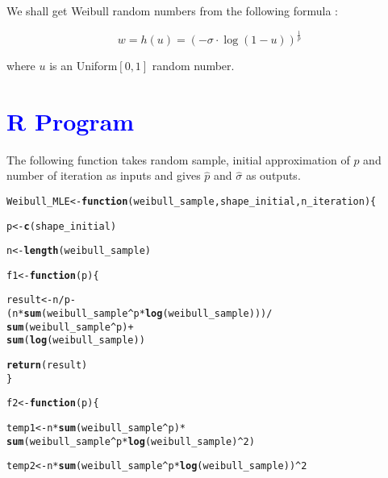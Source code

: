 \documentclass[11pt, a4paper]{article}\usepackage[]{graphicx}\usepackage[]{xcolor}
\makeatletter
\newcommand{\hlnum}[1]{\textcolor[rgb]{0.686,0.059,0.569}{#1}}%
\newcommand{\hlopt}[1]{\textcolor[rgb]{0,0,0}{#1}}%
\newcommand{\hldef}[1]{\textcolor[rgb]{0.345,0.345,0.345}{#1}}%
\newcommand{\hlkwa}[1]{\textcolor[rgb]{0.161,0.373,0.58}{\textbf{#1}}}%
\newcommand{\hlkwb}[1]{\textcolor[rgb]{0.69,0.353,0.396}{#1}}%
\newcommand{\hlkwc}[1]{\textcolor[rgb]{0.333,0.667,0.333}{#1}}%
\newcommand{\hlkwd}[1]{\textcolor[rgb]{0.737,0.353,0.396}{\textbf{#1}}}%
\newenvironment{kframe}{%
 \def\at@end@of@kframe{}%
 \ifinner\ifhmode%
  \def\at@end@of@kframe{\end{minipage}}%
  \begin{minipage}{\columnwidth}%
 \fi\fi%
 \def\FrameCommand##1{\hskip\@totalleftmargin \hskip-\fboxsep
 \colorbox{shadecolor}{##1}\hskip-\fboxsep
     \hskip-\linewidth \hskip-\@totalleftmargin \hskip\columnwidth}%
 \MakeFramed {\advance\hsize-\width
   \@totalleftmargin\z@ \linewidth\hsize
   \@setminipage}}%
 {\par\unskip\endMakeFramed%
 \at@end@of@kframe}
\newenvironment{knitrout}{}{} %
\makeatother
\begin{document}
We shall get Weibull random numbers from the following formula :

$$w = h(u) = (-\sigma \cdot \log (1 - u))^\frac{1}{p}$$

where $u$ is an Uniform$[0, 1]$ random number.


\section*{\faArrowAltCircleRight[regular] \textcolor{blue}{R Program}}

The following function takes random sample, initial approximation of $p$ and number of iteration as inputs and gives $\hat{p}$ and $\hat{\sigma}$ as outputs.

\begin{knitrout}
\color{fgcolor}\begin{kframe}
\begin{alltt}
\hldef{Weibull_MLE} \hlkwb{<-} \hlkwa{function}\hldef{(}\hlkwc{weibull_sample}\hldef{,} \hlkwc{shape_initial}\hldef{,} \hlkwc{n_iteration}\hldef{)\{}

  \hldef{p} \hlkwb{<-} \hlkwd{c}\hldef{(shape_initial)}

  \hldef{n} \hlkwb{<-} \hlkwd{length}\hldef{(weibull_sample)}

  \hldef{f1} \hlkwb{<-} \hlkwa{function}\hldef{(}\hlkwc{p}\hldef{)\{}

    \hldef{result} \hlkwb{<-} \hldef{n} \hlopt{/} \hldef{p} \hlopt{-}
              \hldef{( n} \hlopt{*} \hlkwd{sum}\hldef{(weibull_sample}\hlopt{^}\hldef{p} \hlopt{*} \hlkwd{log}\hldef{(weibull_sample)) )} \hlopt{/}
                        \hlkwd{sum}\hldef{(weibull_sample}\hlopt{^}\hldef{p)} \hlopt{+}
              \hlkwd{sum}\hldef{(}\hlkwd{log}\hldef{(weibull_sample))}

    \hlkwd{return}\hldef{(result)}
  \hldef{\}}

  \hldef{f2} \hlkwb{<-} \hlkwa{function}\hldef{(}\hlkwc{p}\hldef{)\{}

    \hldef{temp1} \hlkwb{<-} \hldef{n} \hlopt{*} \hlkwd{sum}\hldef{(weibull_sample}\hlopt{^}\hldef{p)} \hlopt{*}
                 \hlkwd{sum}\hldef{(weibull_sample}\hlopt{^}\hldef{p} \hlopt{*} \hlkwd{log}\hldef{(weibull_sample)}\hlopt{^}\hlnum{2}\hldef{)}

    \hldef{temp2} \hlkwb{<-} \hldef{n} \hlopt{*} \hlkwd{sum}\hldef{(weibull_sample}\hlopt{^}\hldef{p} \hlopt{*} \hlkwd{log}\hldef{(weibull_sample))}\hlopt{^}\hlnum{2}


\end{alltt}
\end{kframe}
\end{knitrout}
\end{document}

